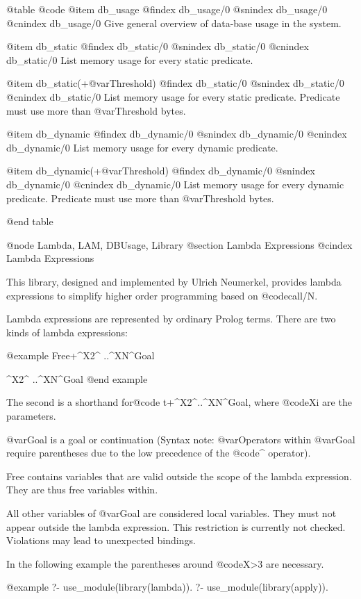 {{{{{{{{{@table @code
@item db_usage
@findex db_usage/0
@snindex db_usage/0
@cnindex db_usage/0
Give general overview of data-base usage in the system.

@item db_static
@findex db_static/0
@snindex db_static/0
@cnindex db_static/0
List memory usage for every static predicate.

@item db_static(+@var{Threshold})
@findex db_static/0
@snindex db_static/0
@cnindex db_static/0
List memory usage for every static predicate. Predicate must use more
than @var{Threshold} bytes.

@item db_dynamic
@findex db_dynamic/0
@snindex db_dynamic/0
@cnindex db_dynamic/0
List memory usage for every dynamic predicate.

@item db_dynamic(+@var{Threshold})
@findex db_dynamic/0
@snindex db_dynamic/0
@cnindex db_dynamic/0
List memory usage for every dynamic predicate. Predicate must use more
than @var{Threshold} bytes.

@end table

@node Lambda, LAM, DBUsage, Library
@section Lambda Expressions
@cindex Lambda Expressions


This library, designed and implemented by Ulrich Neumerkel, provides
lambda expressions to simplify higher order programming based on @code{call/N}.

Lambda expressions are represented by ordinary Prolog terms.  There are
two kinds of lambda expressions:

@example
    Free+^X2^ ..^XN^Goal

         ^X2^ ..^XN^Goal
@end example

The second is a shorthand for@code{ t+^X2^..^XN^Goal}, where @code{Xi} are the parameters.

@var{Goal} is a goal or continuation (Syntax note: @var{Operators} within @var{Goal}
require parentheses due to the low precedence of the @code{^} operator).

Free contains variables that are valid outside the scope of the lambda
expression. They are thus free variables within.

All other variables of @var{Goal} are considered local variables. They must
not appear outside the lambda expression. This restriction is
currently not checked. Violations may lead to unexpected bindings.

In the following example the parentheses around @code{X>3} are necessary.

@example
?- use_module(library(lambda)).
?- use_module(library(apply)).

}}}}}}}}}
